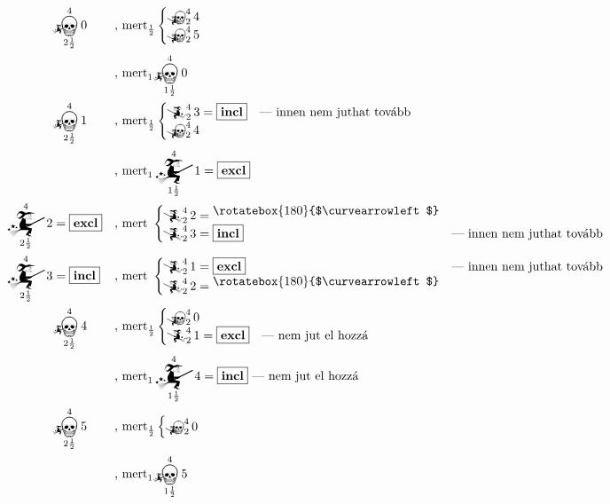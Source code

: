 \documentclass{article}
\newcommand{\nothing}{\text{\raisebox{0.4em}{\rotatebox{180}{$\curvearrowleft$}}}}%
\newcommand{\just}[1]{\boxed{#1}}%
\newcommand{\incl}{\mathbf{incl}}
\newcommand{\excl}{\mathbf{excl}}
\newcommand{\mainfunA}[3]{\mathwitch_{#2}^{#1}#3}
\newcommand{\mainfunB}[3]{\reversemathwitch_{#2}^{#1}#3}
\newcommand{\nomainfunA}[3]{{}_{\mathwitch}\!\!\!\!\bigskull^{#1}_{#2}#3}
\newcommand{\nomainfunB}[3]{{}_{\reversemathwitch}\!\!\!\!\bigskull^{#1}_{#2}#3}
\begin{document}
	\begin{align*}
		&\nomainfunA4{2\frac12}0               &&\text{, mert}_\frac12\begin{cases}\nomainfunB424\\\nomainfunB425\end{cases}\\
		&                                     &&\text{, mert}_1\nomainfunA4{1\frac12}0\\
		&\nomainfunA4{2\frac12}1               &&\text{, mert}_\frac12\begin{cases}\mainfunB423 = \just\incl&\text{--- innen nem juthat tovább}\\\nomainfunB424\end{cases}\\
		&                                     &&\text{, mert}_1\mainfunA4{1\frac12}1 = \just\excl\\
		\mainfunA4{2\frac12}2   &= \just\excl  &&\text{, mert }\begin{cases}\mainfunB422 = \nothing\\\mainfunB423 = \just\incl&\text{--- innen nem juthat tovább}\end{cases}\\
		\mainfunA4{2\frac12}3   &= \just\incl  &&\text{, mert }\begin{cases}\mainfunB421 = \just\excl&\text{--- innen nem juthat tovább}\\\mainfunB422 = \nothing&\end{cases}\\
		&\nomainfunA4{2\frac12}4               &&\text{, mert}_\frac12\begin{cases}\nomainfunB420\\\mainfunB421 = \just\excl&\text{--- nem jut el hozzá}\end{cases}\\
		&                                     &&\text{, mert}_1\mainfunA4{1\frac12}4=\just\incl\text{ --- nem jut el hozzá}\\
		&\nomainfunA4{2\frac12}5               &&\text{, mert}_\frac12\begin{cases}\nomainfunB420\end{cases}\\
		&                                     &&\text{, mert}_1\nomainfunA4{1\frac12}5
	\end{align*}
\end{document}
